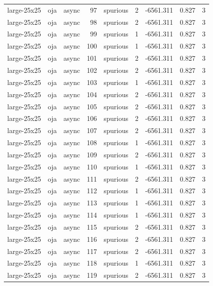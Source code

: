 \begin{tabular}{lllrlrrrr}
large-25x25 & oja & async & 97 & spurious & 2 & -6561.311 & 0.827 & 3 \\
large-25x25 & oja & async & 98 & spurious & 2 & -6561.311 & 0.827 & 3 \\
large-25x25 & oja & async & 99 & spurious & 1 & -6561.311 & 0.827 & 3 \\
large-25x25 & oja & async & 100 & spurious & 1 & -6561.311 & 0.827 & 3 \\
large-25x25 & oja & async & 101 & spurious & 2 & -6561.311 & 0.827 & 3 \\
large-25x25 & oja & async & 102 & spurious & 2 & -6561.311 & 0.827 & 3 \\
large-25x25 & oja & async & 103 & spurious & 1 & -6561.311 & 0.827 & 3 \\
large-25x25 & oja & async & 104 & spurious & 2 & -6561.311 & 0.827 & 3 \\
large-25x25 & oja & async & 105 & spurious & 2 & -6561.311 & 0.827 & 3 \\
large-25x25 & oja & async & 106 & spurious & 2 & -6561.311 & 0.827 & 3 \\
large-25x25 & oja & async & 107 & spurious & 2 & -6561.311 & 0.827 & 3 \\
large-25x25 & oja & async & 108 & spurious & 1 & -6561.311 & 0.827 & 3 \\
large-25x25 & oja & async & 109 & spurious & 2 & -6561.311 & 0.827 & 3 \\
large-25x25 & oja & async & 110 & spurious & 1 & -6561.311 & 0.827 & 3 \\
large-25x25 & oja & async & 111 & spurious & 2 & -6561.311 & 0.827 & 3 \\
large-25x25 & oja & async & 112 & spurious & 1 & -6561.311 & 0.827 & 3 \\
large-25x25 & oja & async & 113 & spurious & 1 & -6561.311 & 0.827 & 3 \\
large-25x25 & oja & async & 114 & spurious & 1 & -6561.311 & 0.827 & 3 \\
large-25x25 & oja & async & 115 & spurious & 2 & -6561.311 & 0.827 & 3 \\
large-25x25 & oja & async & 116 & spurious & 2 & -6561.311 & 0.827 & 3 \\
large-25x25 & oja & async & 117 & spurious & 2 & -6561.311 & 0.827 & 3 \\
large-25x25 & oja & async & 118 & spurious & 1 & -6561.311 & 0.827 & 3 \\
large-25x25 & oja & async & 119 & spurious & 2 & -6561.311 & 0.827 & 3 \\

\end{tabular}
